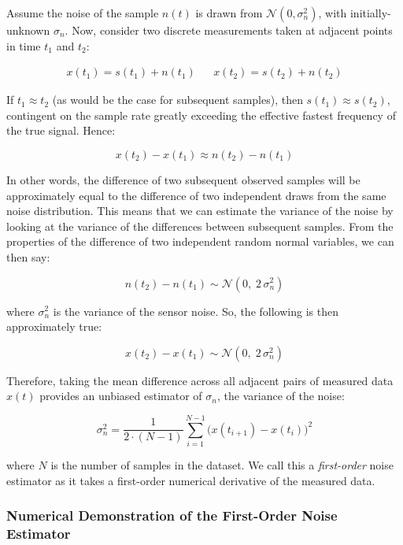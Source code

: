 Assume the noise of the sample $n(t)$ is drawn from $\mathcal{N}(0, \sigma^2_n)$, with initially-unknown $\sigma_n$. Now, consider two discrete measurements taken at adjacent points in time $t_1$ and $t_2$:

\begin{align*}
    x(t_1) = s(t_1) + n(t_1) &&
    x(t_2) = s(t_2) + n(t_2)
\end{align*}

\noindent If $t_1 \approx t_2$ (as would be the case for subsequent samples), then $s(t_1) \approx s(t_2)$, contingent on the sample rate greatly exceeding the effective fastest frequency of the true signal. Hence:

$$x(t_2) - x(t_1) \approx n(t_2) - n(t_1)$$

In other words, the difference of two subsequent observed samples will be approximately equal to the difference of two independent draws from the same noise distribution. This means that we can estimate the variance of the noise by looking at the variance of the differences between subsequent samples. From the properties of the difference of two independent random normal variables, we can then say:

$$n(t_2) - n(t_1) \sim \mathcal{N}(0,\; 2\, \sigma^2_n)$$

\noindent where $\sigma^2_n$ is the variance of the sensor noise. So, the following is then approximately true:

$$x(t_2) - x(t_1) \sim \mathcal{N}(0,\; 2\, \sigma^2_n)$$

Therefore, taking the mean difference across all adjacent pairs of measured data $x(t)$ provides an unbiased estimator of $\sigma_n$, the variance of the noise:

\begin{equation}
    \sigma^2_n = \frac{1}{2 \cdot (N-1)} \sum_{i=1}^{N-1} \Big( x(t_{i+1}) - x(t_i) \Big)^2
    \label{eq:1st_order_noise_estimator}
\end{equation}

\noindent where $N$ is the number of samples in the dataset. We call this a \emph{first-order} noise estimator as it takes a first-order numerical derivative of the measured data.

\subsubsection{Numerical Demonstration of the First-Order Noise Estimator}

